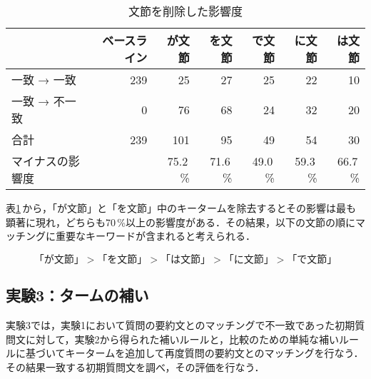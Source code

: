\begin{table}[ht]
 \caption{文節を削除した影響度}
 \label{tab:delsets}
 \begin{center}
  \begin{tabular}{|l|r|r|r|r|r|r|} \hline
   & ベースライン & が文節 & を文節 & で文節 & に文節 & は文節 \\ \hline \hline
   一致 → 一致 & 239 & 25 & 27 & 25 & 22 & 10 \\ \hline
   一致 → 不一致 & 0 & 76 & 68 & 24 & 32 & 20 \\ \hline \hline
   合計 & 239 & 101 & 95 & 49 & 54 & 30 \\ \hline
   マイナスの影響度 & & 75.2\,\% & 71.6\,\% & 49.0\,\% & 59.3\,\% & 66.7\,\% \\ \hline
  \end{tabular}
 \end{center}
\end{table}

表\ref{tab:delsets}\,から，「が文節」と「を文節」中のキータームを除去するとその影響は最も顕著に現れ，どちらも70\,\%以上の影響度がある．その結果，以下の文節の順にマッチングに重要なキーワードが含まれると考えられる．

\[
 \mbox{「が文節」} > \mbox{「を文節」} > \mbox{「は文節」} > \mbox{「に文節」} > \mbox{「で文節」}
\]

\vspace*{1cm}

\subsection{実験3：タームの補い}

実験3では，実験1において質問の要約文とのマッチングで不一致であった初期質問文に対して，実験2から得られた補いルールと，比較のための単純な補いルールに基づいてキータームを追加して再度質問の要約文とのマッチングを行なう．その結果一致する初期質問文を調べ，その評価を行なう．

